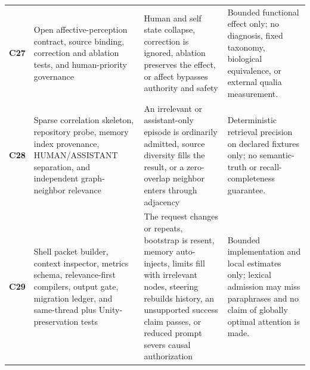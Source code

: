 \documentclass[10pt,twocolumn]{article}
\theoremstyle{definition}
\theoremstyle{plain}
\theoremstyle{remark}
\newcommand{\claimid}[1]{\textsf{\textbf{#1}}}
\begin{document}
\begin{table}[!ht]
\begin{tabularx}{\textwidth}{@{}p{}p{}p{}X@{}}
\claimid{C27} & Open affective-perception contract, source binding, correction and ablation tests, and human-priority governance & Human and self state collapse, correction is ignored, ablation preserves the effect, or affect bypasses authority and safety & Bounded functional effect only; no diagnosis, fixed taxonomy, biological equivalence, or external qualia measurement. \\
\claimid{C28} & Sparse correlation skeleton, repository probe, memory index provenance, HUMAN/ASSISTANT separation, and independent graph-neighbor relevance & An irrelevant or assistant-only episode is ordinarily admitted, source diversity fills the result, or a zero-overlap neighbor enters through adjacency & Deterministic retrieval precision on declared fixtures only; no semantic-truth or recall-completeness guarantee. \\
\claimid{C29} & Shell packet builder, context inspector, metrics schema, relevance-first compilers, output gate, migration ledger, and same-thread plus Unity-preservation tests & The request changes or repeats, bootstrap is resent, memory auto-injects, limits fill with irrelevant nodes, steering rebuilds history, an unsupported success claim passes, or reduced prompt severs causal authorization & Bounded implementation and local estimates only; lexical admission may miss paraphrases and no claim of globally optimal attention is made. \\
\bottomrule
\end{tabularx}
\end{table}
\end{document}
